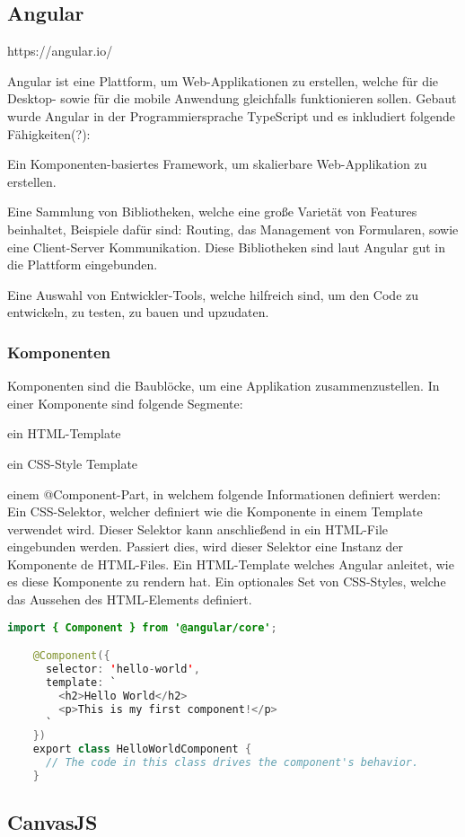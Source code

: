 \subsection{Angular}
https://angular.io/ 

Angular ist eine Plattform, um Web-Applikationen zu erstellen, welche für die Desktop- sowie für die mobile Anwendung gleichfalls funktionieren sollen. Gebaut wurde Angular in der Programmiersprache TypeScript und es inkludiert folgende Fähigkeiten(?):

\begin{compactitem}
    \item Ein Komponenten-basiertes Framework, um skalierbare Web-Applikation zu erstellen.
    \item Eine Sammlung von Bibliotheken, welche eine große Varietät von Features beinhaltet, Beispiele dafür sind: Routing, das Management von Formularen, sowie eine Client-Server Kommunikation. Diese Bibliotheken sind laut Angular gut in die Plattform eingebunden.       
    \item Eine Auswahl von Entwickler-Tools, welche hilfreich sind, um den Code zu entwickeln, zu testen, zu bauen und upzudaten.
\end{compactitem}

\subsubsection{Komponenten}
Komponenten sind die Baublöcke, um eine Applikation zusammenzustellen. In einer Komponente sind folgende Segmente: 

\begin{compactitem}
    \item ein HTML-Template
    \item ein CSS-Style Template      
    \item einem @Component-Part, in welchem folgende Informationen definiert werden:
    \subitem Ein CSS-Selektor, welcher definiert wie die Komponente in einem Template verwendet wird. Dieser Selektor kann anschließend in ein HTML-File eingebunden werden. Passiert dies, wird dieser Selektor eine Instanz der Komponente de HTML-Files.
    \subitem Ein HTML-Template welches Angular anleitet, wie es diese Komponente zu rendern hat.
    \subitem Ein optionales Set von CSS-Styles, welche das Aussehen des HTML-Elements definiert.
\end{compactitem}

\begin{lstlisting}[language=java,caption=Beipsiel für eine minimierte Angular Komponente,label=lst:impl:foo]
    import { Component } from '@angular/core';

    @Component({
      selector: 'hello-world',
      template: `
        <h2>Hello World</h2>
        <p>This is my first component!</p>
      `
    })
    export class HelloWorldComponent {
      // The code in this class drives the component's behavior.
    }
\end{lstlisting}

\subsection{CanvasJS}
